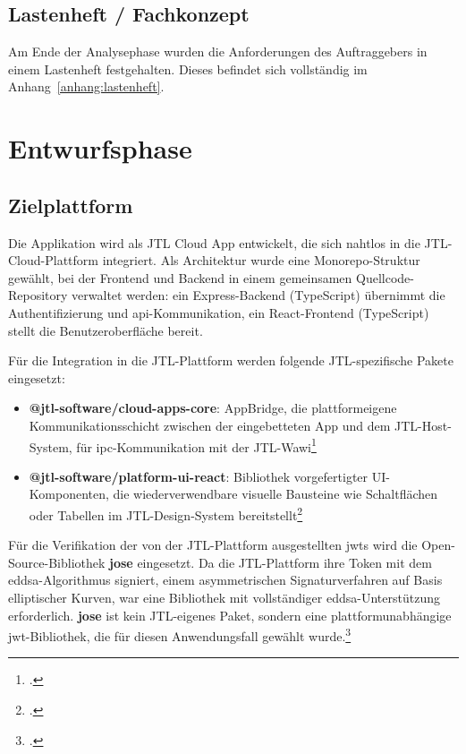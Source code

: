 \documentclass[11pt, a4paper, oneside]{report}
\begin{document}
\section{Lastenheft / Fachkonzept}

Am Ende der Analysephase wurden die Anforderungen des Auftraggebers in einem Lastenheft
festgehalten. Dieses befindet sich vollständig im Anhang~\ref{anhang:lastenheft}.

\chapter{Entwurfsphase}

\section{Zielplattform}

Die Applikation wird als JTL Cloud App entwickelt, die sich nahtlos in die
JTL-Cloud-Plattform integriert. Als Architektur wurde eine Monorepo-Struktur gewählt, bei der Frontend und Backend in einem gemeinsamen Quellcode-Repository verwaltet werden:
ein Express-Backend (TypeScript) übernimmt die Authentifizierung und \gls{api}-Kommunikation,
ein React-Frontend (TypeScript) stellt die Benutzeroberfläche bereit.

Für die Integration in die JTL-Plattform werden folgende JTL-spezifische Pakete eingesetzt:

\begin{itemize}[leftmargin=1.5em]
  \item \textbf{@jtl-software/cloud-apps-core}: AppBridge, die plattformeigene
        Kommunikationsschicht zwischen der eingebetteten App und dem JTL-Host-System,
        für \gls{ipc}-Kommunikation mit der JTL-Wawi\footcite{jtl_appbridge}
  \item \textbf{@jtl-software/platform-ui-react}: Bibliothek vorgefertigter
        UI-Komponenten, die wiederverwendbare visuelle Bausteine wie Schaltflächen
        oder Tabellen im JTL-Design-System bereitstellt\footcite{jtl_platform_ui}
\end{itemize}

Für die Verifikation der von der JTL-Plattform ausgestellten \glspl{jwt} wird
die Open-Source-Bibliothek \textbf{jose} eingesetzt. Da die JTL-Plattform ihre
Token mit dem \gls{eddsa}-Algorithmus signiert, einem asymmetrischen Signaturverfahren
auf Basis elliptischer Kurven, war eine Bibliothek mit vollständiger \gls{eddsa}-Unterstützung
erforderlich. \textbf{jose} ist kein JTL-eigenes Paket, sondern eine
plattformunabhängige \gls{jwt}-Bibliothek, die für diesen Anwendungsfall gewählt wurde.\footcite{jose_npm}
\end{document}
